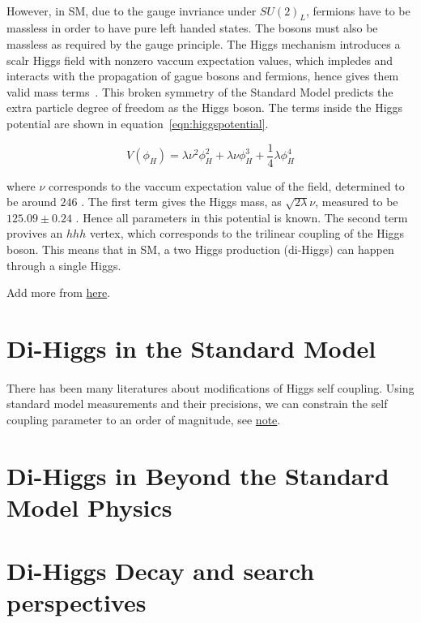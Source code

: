 \paragraph{}
However, in SM, due to the gauge invriance under $SU(2)_{L}$, fermions have to be massless in order to have pure left handed states. The bosons must also be massless as required by the gauge principle. The Higgs mechanism introduces a scalr Higgs field with nonzero vaccum expectation values, which impledes and interacts with the propagation of gague bosons and fermions, hence gives them valid mass terms~\cite{Tully}. This broken symmetry of the Standard Model predicts the extra particle degree of freedom as the Higgs boson. The terms inside the Higgs potential are shown in equation~\ref{eqn:higgspotential}.

\begin{equation}
\label{eqn:higgspotential}
V(\phi_{H}) = \lambda \nu^2 \phi_{H} ^2  + \lambda \nu \phi_{H} ^3  + \frac{1}{4}\lambda \phi_{H} ^4 
\end{equation}

where $\nu$ corresponds to the vaccum expectation value of the field, determined to be around $246$ \GeV. The first term gives the Higgs mass, as $ \sqrt{2\lambda}\nu$, measured to be $125.09 \pm 0.24$ \GeV. Hence all parameters in this potential is known. The second term provives an $hhh$ vertex, which corresponds to the trilinear coupling of the Higgs boson. This means that in SM, a two Higgs production (di-Higgs) can happen through a single Higgs.

Add more from \href{http://pdg.lbl.gov/2017/reviews/rpp2016-rev-higgs-boson.pdf}{here}.



\section{Di-Higgs in the Standard Model}
\paragraph{}
There has been many literatures about modifications of Higgs self coupling. Using standard model measurements and their precisions, we can constrain the self coupling parameter to an order of magnitude, see \href{https://arxiv.org/abs/1702.07678}{note}.


\section{Di-Higgs in Beyond the Standard Model Physics}


\section{Di-Higgs Decay and search perspectives}

